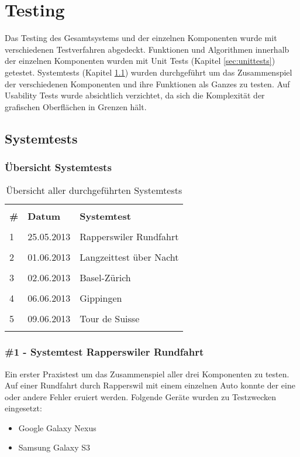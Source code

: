 \section{Testing}
Das Testing des Gesamtsystems und der einzelnen Komponenten wurde mit verschiedenen Testverfahren abgedeckt. Funktionen und Algorithmen innerhalb der einzelnen Komponenten wurden mit Unit Tests (Kapitel \ref{sec:unittests}) getestet. Systemtests (Kapitel \ref{sec:systemtests}) wurden durchgeführt um das Zusammenspiel der verschiedenen Komponenten und ihre Funktionen als Ganzes zu testen. Auf Usability Tests wurde absichtlich verzichtet, da sich die Komplexität der grafischen Oberflächen in Grenzen hält. 

\subsection{Systemtests}
\label{sec:systemtests}

\subsubsection{Übersicht Systemtests}
\begin{longtable}{p{0.3cm}|p{1.8cm}|p{9.3cm}}
& &  \\ [-1.5ex]
\textbf{\#} & \textbf{Datum} & \textbf{Systemtest} \\ [1ex] \hline & &  \\ [-1.5ex]
1 & 25.05.2013 & Rapperswiler Rundfahrt \\ [1ex] \hline & &  \\ [-1.5ex]
2 & 01.06.2013 & Langzeittest über Nacht \\ [1ex] \hline & &  \\ [-1.5ex]
3 & 02.06.2013 & Basel-Zürich \\ [1ex] \hline & &  \\ [-1.5ex]
4 & 06.06.2013 & Gippingen \\ [1ex] \hline & &  \\ [-1.5ex]
5 & 09.06.2013 & Tour de Suisse \\ [1ex]
\caption{Übersicht aller durchgeführten Systemtests}
\end{longtable} 

\subsubsection{\#1 - Systemtest Rapperswiler Rundfahrt}
Ein erster Praxistest um das Zusammenspiel aller drei Komponenten zu testen. Auf einer Rundfahrt durch Rapperswil mit einem einzelnen Auto konnte der eine oder andere Fehler eruiert werden. Folgende Geräte wurden zu Testzwecken eingesetzt:
\begin{itemize} [noitemsep,topsep=0pt]
	\item{Google Galaxy Nexus}
	\item{Samsung Galaxy S3}
\end{itemize}

